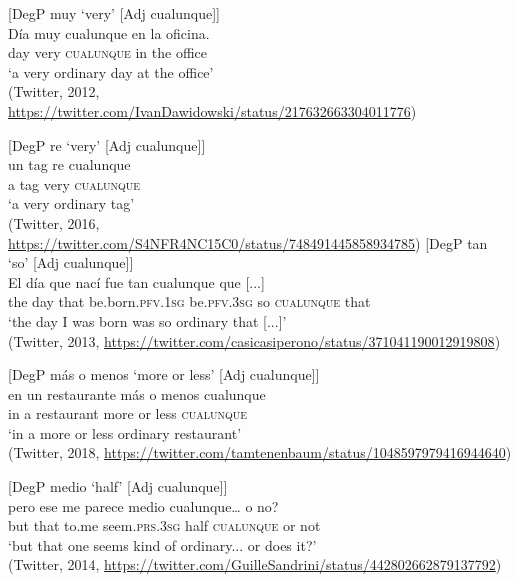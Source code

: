 \documentclass[output=paper,colorlinks,citecolor=brown]{langscibook}
\begin{document}
    \ex \label{ex:fk90}
    [DegP muy ‘very’ [Adj cualunque]]\\
    \gll Día muy cualunque en la oficina.\\
    day very \textsc{cualunque} in the office\\
    \glt ‘a very ordinary day at the office’\\
    (Twitter, 2012, \url{https://twitter.com/IvanDawidowski/status/217632663304011776})
    
    \ex \label{ex:fk91}
    [DegP re ‘very’ [Adj cualunque]]\\
    \gll un tag re cualunque \\
    a tag very \textsc{cualunque}\\
    \glt ‘a very ordinary tag’\\
        (Twitter, 2016, \url{https://twitter.com/S4NFR4NC15C0/status/748491445858934785})
    \largerpage[2]
    \ex \label{ex:fk92}
    [DegP tan ‘so’ [Adj cualunque]]\\
    \gll El día que nací fue tan cualunque que [...]\\
    the day that be.born.\textsc{pfv.1sg} be.\textsc{pfv.3sg} so \textsc{cualunque} that\\
    \glt ‘the day I was born was so ordinary that [...]’\\
    (Twitter, 2013, \url{https://twitter.com/casicasiperono/status/371041190012919808})
    
    \ex \label{ex:fk93}
    [DegP más o menos ‘more or less’ [Adj cualunque]]\\
    \gll en un restaurante más o menos cualunque\\
    in a restaurant more or less \textsc{cualunque}\\
    \glt ‘in a more or less ordinary restaurant’\\
    (Twitter, 2018, \url{https://twitter.com/tamtenenbaum/status/1048597979416944640})

    \ex \label{ex:fk94} 
    [DegP medio ‘half’ [Adj cualunque]]\\
    \gll pero ese me parece medio cualunque… o no?\\
    but that to.me seem.\textsc{prs.3sg} half \textsc{cualunque} or not\\
    \glt ‘but that one seems kind of ordinary... or does it?’\\
    (Twitter, 2014, \url{https://twitter.com/GuilleSandrini/status/442802662879137792})
\z

\label{sec:fk9.2}
\end{document}
